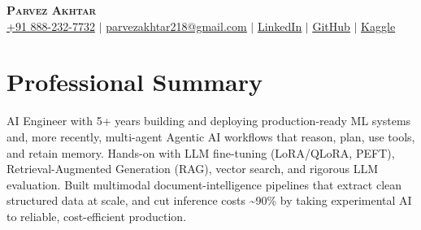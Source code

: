 \documentclass[11pt,a4paper]{article}
\begin{document}
\begin{center}
    \textbf{\Huge \scshape Parvez Akhtar} \\ \vspace{1pt}
    \small \href{tel:+918882327732}{+91 888-232-7732} $\vert$ \href{mailto:parvezakhtar218@gmail.com}{\underline{parvezakhtar218@gmail.com}} $\vert$
    \href{https://www.linkedin.com/in/parvezakhtar/}{\underline{LinkedIn}} $\vert$
    \href{https://github.com/ipmob}{\underline{GitHub}} $\vert$
    \href{https://www.kaggle.com/parvez218}{\underline{Kaggle}}
\end{center}

\section{Professional Summary}
\small{AI Engineer with 5+ years building and deploying production-ready ML systems and, more recently, multi-agent Agentic AI workflows that reason, plan, use tools, and retain memory. Hands-on with LLM fine-tuning (LoRA/QLoRA, PEFT), Retrieval-Augmented Generation (RAG), vector search, and rigorous LLM evaluation. Built multimodal document-intelligence pipelines that extract clean structured data at scale, and cut inference costs \textasciitilde{}90\% by taking experimental AI to reliable, cost-efficient production.}

\end{document}
